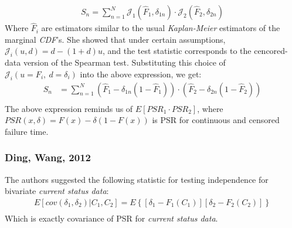 \documentclass[]{article}
\begin{document}

	$$
	\begin{aligned}
		 S_n = \sum_{n=1}^N \mathcal{J}_1( \hat{F}_1, \delta_{1n}) \cdot \mathcal{J}_2( \hat{F}_2, \delta_{2n})
	\end{aligned}
	$$
Where $\hat{F}_i$ are estimators similar to the usual \emph{Kaplan-Meier} estimators of the marginal \emph{CDF}'s. She showed that under certain assumptions, $\mathcal{J}_i(u,d) =d-(1+d)u$, and the test statistic corresponds to the cencored-data version of the Spearman test. Substituting this choice of $\mathcal{J}_i(u=F_i,~d=\delta_i)$ into the above expression, we get:
	$$
	\begin{aligned}
		 S_n &= \sum_{n=1}^N (\hat{F}_1 - \delta_{1n}(1-\hat{F}_1))\cdot (\hat{F}_2 - \delta_{2n}(1-\hat{F}_2))\\
	\end{aligned}
	$$
The above expression reminds us of $E[PSR_1 \cdot PSR_2]$, where $PSR(x, \delta) = F(x)-\delta(1-F(x))$ is PSR for continuous and censored failure time. 


\subsubsection{Ding, Wang, 2012 \cite{ding2004testing}}
The authors suggested the following statistic for testing independence for bivariate \emph{current status data}:
	$$
	\begin{aligned}
		 E[cov(\delta_1, \delta_2)|C_1,C_2] = E\left\{ [\delta_1 - F_1(C_1)][\delta_2 - F_2(C_2)]  \right\}\\
	\end{aligned}
	$$
Which is exactly covariance of PSR for \emph{current status data}.
\end{document}
